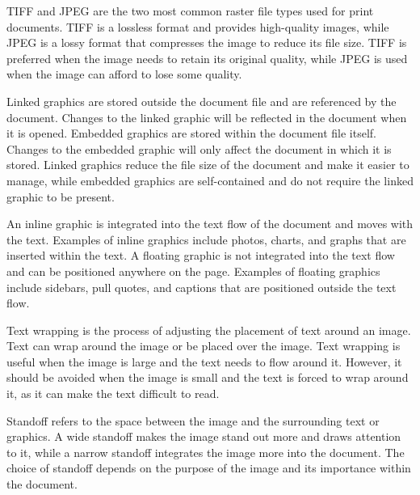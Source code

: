 \documentclass{report}
\begin{document}
    \bigbreak \noindent \bigbreak \noindent 
    \bigbreak \noindent 
    \bigbreak \noindent 
    TIFF and JPEG are the two most common raster file types used for print documents. TIFF is a lossless format and provides high-quality images, while JPEG is a lossy format that compresses the image to reduce its file size. TIFF is preferred when the image needs to retain its original quality, while JPEG is used when the image can afford to lose some quality.


    \bigbreak \noindent \bigbreak \noindent 
    \bigbreak \noindent 
    \bigbreak \noindent 
    Linked graphics are stored outside the document file and are referenced by the document. Changes to the linked graphic will be reflected in the document when it is opened. Embedded graphics are stored within the document file itself. Changes to the embedded graphic will only affect the document in which it is stored. Linked graphics reduce the file size of the document and make it easier to manage, while embedded graphics are self-contained and do not require the linked graphic to be present.

    \bigbreak \noindent \bigbreak \noindent 
    \bigbreak \noindent 
    \bigbreak \noindent 
    An inline graphic is integrated into the text flow of the document and moves with the text. Examples of inline graphics include photos, charts, and graphs that are inserted within the text. A floating graphic is not integrated into the text flow and can be positioned anywhere on the page. Examples of floating graphics include sidebars, pull quotes, and captions that are positioned outside the text flow.

    \bigbreak \noindent \bigbreak \noindent 
    \bigbreak \noindent 
    \bigbreak \noindent 
    Text wrapping is the process of adjusting the placement of text around an image. Text can wrap around the image or be placed over the image. Text wrapping is useful when the image is large and the text needs to flow around it. However, it should be avoided when the image is small and the text is forced to wrap around it, as it can make the text difficult to read.

    \bigbreak \noindent \bigbreak \noindent 
    \bigbreak \noindent 
    \bigbreak \noindent 
    Standoff refers to the space between the image and the surrounding text or graphics. A wide standoff makes the image stand out more and draws attention to it, while a narrow standoff integrates the image more into the document. The choice of standoff depends on the purpose of the image and its importance within the document.



    
\end{document}
